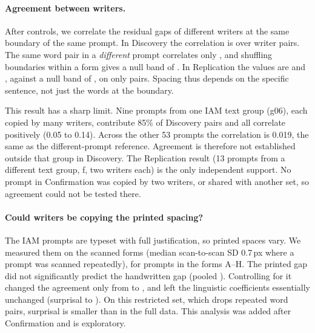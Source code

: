 \documentclass[11pt]{article}
\begin{document}
\paragraph{Agreement between writers.} After controls, we correlate the residual gaps of different writers at the same boundary of the same prompt. In Discovery the correlation is \agrDisc{} \agrDiscCI{} over \pairsDisc{} writer pairs. The same word pair in a \emph{different} prompt correlates only \othDisc{} \othDiscCI, and shuffling boundaries within a form gives a null band of \nulDisc. In Replication the values are \agrRep{} \agrRepCI{} and \othRep{} \othRepCI, against a null band of \nulRep, on only \pairsRep{} pairs. Spacing thus depends on the specific sentence, not just the words at the boundary.

This result has a sharp limit. Nine prompts from one IAM text group (g06), each copied by many writers, contribute 85\% of Discovery pairs and all correlate positively (0.05 to 0.14). Across the other 53 prompts the correlation is 0.019, the same as the different-prompt reference. Agreement is therefore not established outside that group in Discovery. The Replication result (13 prompts from a different text group, f, two writers each) is the only independent support. No prompt in Confirmation was copied by two writers, or shared with another set, so agreement could not be tested there.

\paragraph{Could writers be copying the printed spacing?} The IAM prompts are typeset with full justification, so printed spaces vary. We measured them on the scanned forms (median scan-to-scan SD 0.7\,px where a prompt was scanned repeatedly), for prompts in the forms A--H. The printed gap did not significantly predict the handwritten gap (pooled \printAlone{} \printAloneCI). Controlling for it changed the agreement only from \agrNoPrint{} to \agrPrint{} \agrPrintCI, and left the linguistic coefficients essentially unchanged (surprisal \sSub{} to \sSubP). On this restricted set, which drops repeated word pairs, surprisal is smaller than in the full data. This analysis was added after Confirmation and is exploratory.
\end{document}
